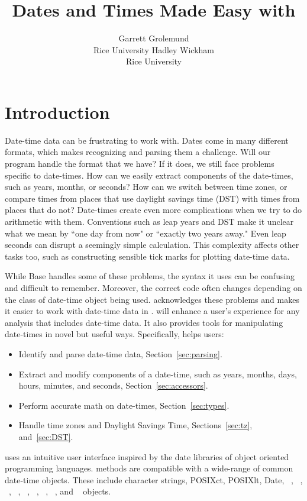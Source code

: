 \documentclass[article]{jss}
\author{Garrett Grolemund\\Rice University \And 
        Hadley Wickham\\Rice University}
\title{Dates and Times Made Easy with \pkg{lubridate}}
\begin{document}
\section{Introduction}

Date-time data can be frustrating to work with. Dates come in many different formats, which makes recognizing and parsing them a challenge. Will our program handle the format that we have? If it does, we still face problems specific to date-times. How can we easily extract components of the date-times, such as years, months, or seconds? How can we switch between time zones, or compare times from places that use daylight savings time (DST) with times from places that do not? Date-times create even more complications when we try to do arithmetic with them. Conventions such as leap years and DST make it unclear what we mean by ``one day from now" or ``exactly two years away."  Even leap seconds can disrupt a seemingly simple calculation.  This complexity affects other tasks too, such as constructing sensible tick marks for plotting date-time data.

While Base  \citep{R} handles some of these problems, the syntax it uses can be confusing and difficult to remember. Moreover, the correct  code often changes depending on the class of date-time object being used.  acknowledges these problems and makes it easier to work with date-time data in .  will enhance a user's experience for any analysis that includes date-time data. It also provides tools for manipulating date-times in novel but useful ways. Specifically,  helps users:

\begin{itemize}
   \item Identify and parse date-time data, Section~\ref{sec:parsing}.
   
    \item Extract and modify components of a date-time, such as years, months, days, hours, minutes, and seconds, Section~\ref{sec:accessors}.
  
  \item Perform accurate math on date-times, Section~\ref{sec:types}.
    
  \item Handle time zones and Daylight Savings Time, Sections~\ref{sec:tz}, and~\ref{sec:DST}.
  
\end{itemize}

 uses an intuitive user interface inspired by the date libraries of object oriented programming languages.   methods are compatible with a wide-range of common date-time objects. These include character strings, POSIXct, POSIXlt, Date,  ~\citep{chron},  ~\citep{fCalendar},  ~\citep{zoo},  ~\citep{xts},  ~\citep{its},  ~\citep{tis},  ~\citep{timeSeries},  ~\citep{fts}, and  ~\citep{tseries} objects. 
\end{document}

